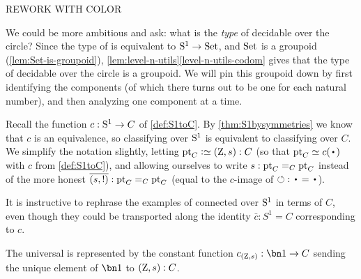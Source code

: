 \begin{remark}
\begin{marginfigure}
  \tikzexternaldisable
  \caption{\color{red} REWORK WITH COLOR}
\end{marginfigure}
\end{remark}

We could be more ambitious and ask: what is the \emph{type} of decidable 
\coverings over the circle?  Since the type of \coverings is 
equivalent to ${\mathrm{S}^1}\to \mathrm{Set}$, and $\mathrm{Set}$ is a groupoid
(\cref{lem:Set-is-groupoid}),
\cref{lem:level-n-utils}\ref{level-n-utils-codom} gives
that the type of decidable \coverings over the circle is a groupoid.  
We will pin this groupoid down by first identifying the components 
(of which there turns out to be one for each natural number), 
and then analyzing one component at a time.

Recall the function $c:{\mathrm{S}^1}\to C$ of \cref{def:S1toC}. 
By \cref{thm:S1bysymmetries} we know that $c$ is an equivalence, 
so classifying \coverings over ${\mathrm{S}^1}$ is equivalent to 
classifying \coverings over $C$.  
We simplify the notation slightly, letting $\pt_C\defeq(\zet,\etop{s}):C$ 
(so that $\pt_C \jdeq c(\base)$ with $c$ from \cref{def:S1toC}), 
and allowing ourselves to write $s:\mathrm{pt}_C=_C\mathrm{pt}_C$ instead of the 
more honest $\overline{({{s}},{!})}:\mathrm{pt}_C=_C\mathrm{pt}_C$ 
(equal to the $c$-image of ${\Sloop}:\base=\base$).

It is instructive to rephrase the examples of connected \coverings over ${\mathrm{S}^1}$ in 
terms of $C$, even though they could be transported along the identity $\bar c:S^1=C$ corresponding to $c$.

\begin{example}\label{exa:univCcover}
The universal \covering is represented by the constant function
$c_{(\zet,\etop{s})}:\bn 1\to C$ sending the unique element 
of $\bn 1$ to $(\mathrm{Z},{s}):C$.
\end{example}

